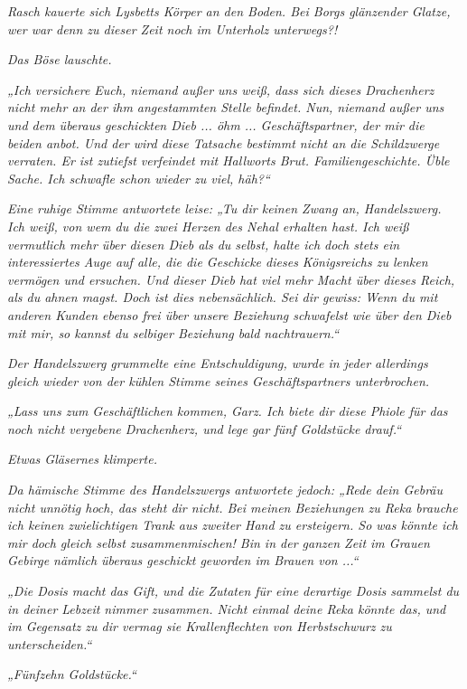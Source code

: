 \textit{Rasch kauerte sich Lysbetts Körper an den Boden. Bei Borgs glänzender Glatze, wer war denn zu dieser Zeit noch im Unterholz unterwegs?!}

\textit{Das Böse lauschte.}

\textit{„Ich versichere Euch, niemand außer uns weiß, dass sich dieses Drachenherz nicht mehr an der ihm angestammten Stelle befindet. Nun, niemand außer uns und dem überaus geschickten Dieb ... öhm ... Geschäftspartner, der mir die beiden anbot. Und der wird diese Tatsache bestimmt nicht an die Schildzwerge verraten. Er ist zutiefst verfeindet mit Hallworts Brut. Familiengeschichte. Üble Sache. Ich schwafle schon wieder zu viel, häh?“}

\textit{Eine ruhige Stimme antwortete leise: „Tu dir keinen Zwang an, Handelszwerg. Ich weiß, von wem du die zwei Herzen des Nehal erhalten hast. Ich weiß vermutlich mehr über diesen Dieb als du selbst, halte ich doch stets ein interessiertes Auge auf alle, die die Geschicke dieses Königsreichs zu lenken vermögen und ersuchen. Und dieser Dieb hat viel mehr Macht über dieses Reich, als du ahnen magst. Doch ist dies nebensächlich. Sei dir gewiss: Wenn du mit anderen Kunden ebenso frei über unsere Beziehung schwafelst wie über den Dieb mit mir, so kannst du selbiger Beziehung bald nachtrauern.“}

\textit{Der Handelszwerg grummelte eine Entschuldigung, wurde in jeder allerdings gleich wieder von der kühlen Stimme seines Geschäftspartners unterbrochen.}

\textit{„Lass uns zum Geschäftlichen kommen, Garz. Ich biete dir diese Phiole für das noch nicht vergebene Drachenherz, und lege gar fünf Goldstücke drauf.“}

\textit{Etwas Gläsernes klimperte.}

\textit{Da hämische Stimme des Handelszwergs antwortete jedoch: „Rede dein Gebräu nicht unnötig hoch, das steht dir nicht. Bei meinen Beziehungen zu Reka brauche ich keinen zwielichtigen Trank aus zweiter Hand zu ersteigern. So was könnte ich mir doch gleich selbst zusammenmischen! Bin in der ganzen Zeit im Grauen Gebirge nämlich überaus geschickt geworden im Brauen von ...“}

\textit{„Die Dosis macht das Gift, und die Zutaten für eine derartige Dosis sammelst du in deiner Lebzeit nimmer zusammen. Nicht einmal deine Reka könnte das, und im Gegensatz zu dir vermag sie Krallenflechten von Herbstschwurz zu unterscheiden.“}

\textit{„Fünfzehn Goldstücke.“}

